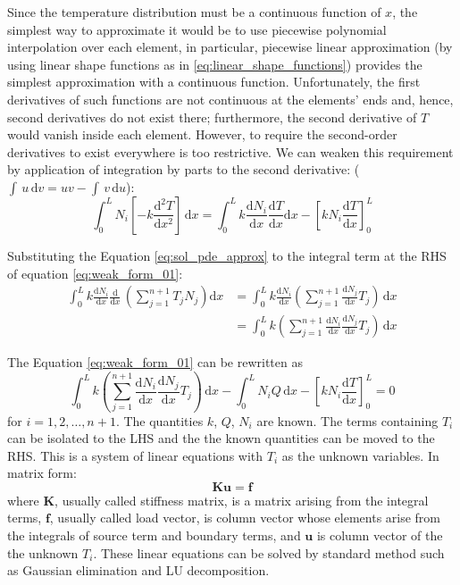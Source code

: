 \documentclass[a4paper,12pt]{article} %
\begin{document}
Since the temperature distribution must be a continuous function of $x$,
the simplest way to approximate it would be to use piecewise polynomial
interpolation over each element, in particular, piecewise linear approximation
(by using linear shape functions as in \eqref{eq:linear_shape_functions})
provides the simplest approximation with a continuous function.
Unfortunately, the first derivatives of such functions are not continuous
at the elements' ends and, hence, second derivatives do not exist there;
furthermore, the second derivative of $T$ would vanish inside each element.
However, to require the second-order derivatives to exist everywhere is
too restrictive.
We can weaken this requirement by application of integration by parts to
the second derivative: ($\int\,u\,\mathrm{d}v = uv - \int\,v\,\mathrm{d}u$):
\begin{equation}
\int_{0}^{L} N_{i} \left[ -k\frac{\mathrm{d}^2 T}{\mathrm{d}x^2} \right]\,\mathrm{d}x =
\int_{0}^{L} k \frac{\mathrm{d} N_{i}}{\mathrm{d}x}
\frac{\mathrm{d} T}{\mathrm{d}x} \mathrm{d}x -
\left[ k N_{i} \frac{\mathrm{d}T}{\mathrm{d}x} \right]_{0}^{L}
\label{eq:weak_form_01}
\end{equation}

Substituting the Equation \eqref{eq:sol_pde_approx} to the integral
term at the RHS of equation \eqref{eq:weak_form_01}:
\begin{align}
\int_{0}^{L} k \frac{\mathrm{d} N_{i}}{\mathrm{d}x}
\frac{\mathrm{d}}{\mathrm{d}x}\, \left( \sum_{j=1}^{n+1} T_{j} N_{j} \right) \mathrm{d}x & =
\int_{0}^{L} k \frac{\mathrm{d} N_{i}}{\mathrm{d}x}
\left( \sum_{j=1}^{n+1} \frac{\mathrm{d}N_{j}}{\mathrm{d}x} T_{j} \right)\, \mathrm{d}x \\
& = \int_{0}^{L} k
\left( \sum_{j=1}^{n+1}
\frac{\mathrm{d} N_{i}}{\mathrm{d}x}
\frac{\mathrm{d}N_{j}}{\mathrm{d}x} T_{j} \right)\, \mathrm{d}x
\end{align}

The Equation \eqref{eq:weak_form_01} can be rewritten as
\begin{equation}
\int_{0}^{L} k
\left( \sum_{j=1}^{n+1}
\frac{\mathrm{d} N_{i}}{\mathrm{d}x}
\frac{\mathrm{d}N_{j}}{\mathrm{d}x} T_{j} \right)\, \mathrm{d}x -
\int_{0}^{L} N_{i} Q\, \mathrm{d}x -
\left[ k N_{i} \frac{\mathrm{d}T}{\mathrm{d}x} \right]_{0}^{L} = 0
\label{eq:weak_form_02}
\end{equation}
for $i=1,2,\ldots,n+1$. The quantities $k$, $Q$, $N_{i}$ are known.
The terms containing $T_{i}$ can be isolated to the LHS and the
the known quantities can be moved to the RHS. This is a system
of linear equations with $T_{i}$ as the unknown variables. In matrix form:
\begin{equation}
\mathbf{K} \mathbf{u} = \mathbf{f}
\label{eq:linear_system}
\end{equation}
where $\mathbf{K}$, usually called stiffness matrix,
is a matrix arising from the integral terms,
$\mathbf{f}$, usually called load vector, is
column vector whose elements arise from
the integrals of source term and boundary terms,
and $\mathbf{u}$ is column vector of the the unknown $T_{i}$.
These linear equations
can be solved by standard method such as Gaussian elimination and LU decomposition.
\end{document}
